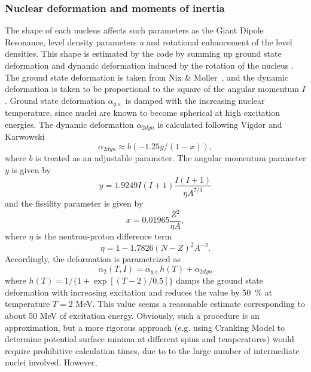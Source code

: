 \documentclass[twocolumn,amsmath,amssymb,10pt,groupedaddress,a4paper]{revtex4}
\begin{document}
\subsubsection{Nuclear deformation and moments of inertia\label{sec: defor}}
The shape of each nucleus affects such parameters as the Giant Dipole
Resonance, level density parameters \emph{a} and rotational enhancement
of the level densities. This shape is estimated
by the code by summing up ground state deformation and dynamic deformation
induced by the rotation of the nucleus . The ground state deformation
is taken from Nix \& Moller~\cite{masses},
and the dynamic deformation is taken to be proportional to the square
of the angular momentum $I$. Ground state deformation $\alpha_{g.s.}$
is damped with the increasing nuclear temperature, since nuclei are
known to become spherical at high excitation energies. The dynamic
deformation $\alpha_{2dyn}$ is calculated following Vigdor and Karwowski
\cite{VK}
\begin{equation}
\alpha_{2dyn}\approx b(-1.25y/(1-x)),
\label{defor}
\end{equation}
\noindent where $b$ is treated as an adjustable parameter. The angular momentum
parameter $y$ is given by
\begin{equation}
y=1.9249I(I+1)\frac{I(I+1)}{\eta A^{7/3}}
\end{equation}
and the fissility parameter is given by
\begin{equation}
x=0.01965\frac{Z^{2}}{\eta A},
\end{equation}
\noindent where $\eta$ is the neutron-proton difference term
 \begin{equation}
\eta=1-1.7826(N-Z)^{2}A^{-2}.
\end{equation}
 Accordingly, the deformation is parametrized as
\begin{equation}
\alpha_{2}(T,I)=\alpha_{g.s.}h(T)+\alpha_{2dyn}
\label{totdefor}
\end{equation}
\noindent where $h(T)=1/\{1+\exp[(T-2)/0.5]\}$ damps the ground state
deformation with increasing excitation and reduces the value by 50~\%
at temperature $T=2$ MeV. This value seems a reasonable estimate
corresponding to about 50 MeV of excitation energy. Obviously, such
a procedure is an approximation, but a more rigorous approach (e.g.
using Cranking Model to determine potential surface minima at different
spins and temperatures) would require prohibitive calculation times,
due to to the large number of intermediate nuclei involved. However,
\end{document}
